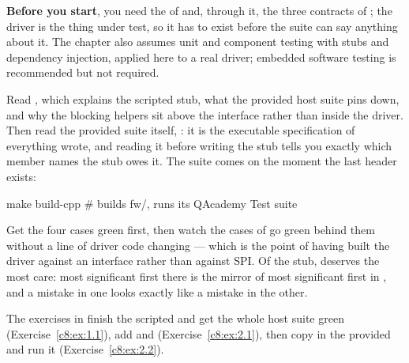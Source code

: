 \textbf{Before you start}, you need the  of  and, through it, the three
contracts of ; the driver is the thing under test, so it has to exist before the suite can
say anything about it. The chapter also assumes unit and component testing with stubs and dependency
injection, applied here to a real driver; embedded software testing is recommended but not required.

Read , which explains the scripted stub, what the provided host suite pins
down, and why the blocking helpers sit above the interface rather than inside the driver. Then read
the provided suite itself, : it is the executable specification of
everything  wrote, and reading it before writing the stub tells you exactly which member
names the stub owes it. The suite comes on the moment the last header exists:

\begin{shell}
make build-cpp        # builds fw/, runs its QAcademy Test suite
\end{shell}

\noindent Get the four  cases green first, then watch the  cases of
 go green behind them without a line of driver code changing --- which is the point of
having built the driver against an interface rather than against SPI. Of the stub, 
deserves the most care: most significant first there is the mirror of most significant first in
, and a mistake in one looks exactly like a mistake in the other.

The exercises in  finish the scripted  and get the whole host
suite green (Exercise~\ref{c8:ex:1.1}), add  and 
(Exercise~\ref{c8:ex:2.1}), then copy in the provided  and run it
(Exercise~\ref{c8:ex:2.2}).




